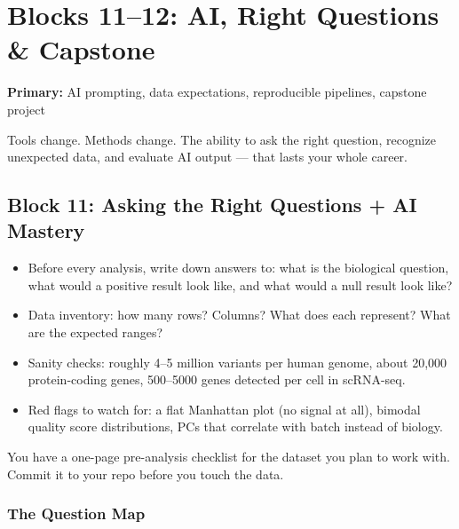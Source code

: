 \chapter{Blocks 11--12: AI, Right Questions \& Capstone}\label{chap:capstone}

\textbf{Primary:} AI prompting, data expectations, reproducible pipelines, capstone project

\begin{brainbox}
Tools change. Methods change. The ability to ask the right question, recognize unexpected data, and evaluate AI output --- that lasts your whole career.
\end{brainbox}


\section{Block 11: Asking the Right Questions + AI Mastery}

\begin{itemize}[nosep]
  \item Before every analysis, write down answers to: what is the biological question, what would a positive result look like, and what would a null result look like?
  \item Data inventory: how many rows? Columns? What does each represent? What are the expected ranges?
  \item Sanity checks: roughly 4--5 million variants per human genome, about 20{,}000 protein-coding genes, 500--5000 genes detected per cell in scRNA-seq.
  \item Red flags to watch for: a flat Manhattan plot (no signal at all), bimodal quality score distributions, PCs that correlate with batch instead of biology.
\end{itemize}
\begin{winbox}[Checkpoint]
You have a one-page pre-analysis checklist for the dataset you plan to work with. Commit it to your repo before you touch the data.
\end{winbox}

\subsection{The Question Map}

